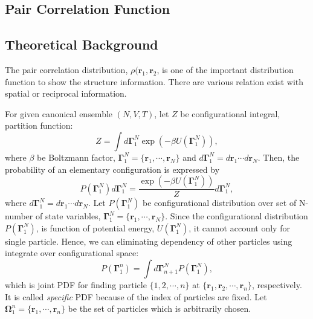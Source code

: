 \documentclass[10pt, a4paper]{report}
\begin{document}
\begin{appendices}
  \section{Pair Correlation Function}
  \label{appen_rdf}
  \subsection{Theoretical Background}
  The pair correlation distribution, $\rho(\mathbf{r}_1, \mathbf{r}_2$, is one of the important distribution function to show the structure information. There are various relation exist with spatial or reciprocal information.

  For given canonical ensemble $(N, V, T)$, let $Z$ be configurational integral, partition function:
  \begin{equation}
    Z = \int d\boldsymbol{\Gamma}_{1}^{N} \exp\left(-\beta U(\boldsymbol{\Gamma}_{1}^{N})\right),
  \end{equation}
  where $\beta$ be Boltzmann factor, $\boldsymbol{\Gamma}_{1}^{N} = \{\mathbf{r}_1,\cdots,\mathbf{r}_N\}$ and $d\boldsymbol{\Gamma}_{1}^{N} = d\mathbf{r}_1\cdots d\mathbf{r}_N$. Then, the probability of an elementary configuration is expressed by
  \begin{equation}
    P(\boldsymbol{\Gamma}_{1}^{N})d\boldsymbol{\Gamma}_{1}^{N} = \frac{\exp\left(-\beta U(\boldsymbol{\Gamma}_{1}^{N})\right)}{Z}d\boldsymbol{\Gamma}_{1}^{N},
  \end{equation}
  where $d\boldsymbol{\Gamma}_{1}^{N} = d\mathbf{r}_1\cdots d\mathbf{r}_N$.
  Let $P(\boldsymbol{\Gamma}_{1}^{N})$ be configurational distribution over set of N-number of state variables, $\boldsymbol{\Gamma}_{1}^{N} = \{\mathbf{r}_1, \cdots, \mathbf{r}_N\}$. Since the configurational distribution $P(\boldsymbol{\Gamma}_{1}^{N})$, is function of potential energy, $U(\boldsymbol{\Gamma}_{1}^{N})$, it cannot account only for single particle. Hence, we can eliminating dependency of other particles using integrate over configurational space:
  \begin{equation}
    P(\boldsymbol{\Gamma}_{1}^{n}) = \int d\boldsymbol{\Gamma}_{n+1}^{N} P(\boldsymbol{\Gamma}_{1}^{N}),
    \label{eq:reduced_configuration_distribution}
  \end{equation}
  which is joint PDF for finding particle $\{1, 2, \cdots, n\}$ at $\{\mathbf{r}_1, \mathbf{r}_2, \cdots, \mathbf{r}_n\}$, respectively. It is called \textit{specific} PDF because of the index of particles are fixed.
  Let $\boldsymbol{\Omega}_{1}^{n} = \{\mathbf{r}_1,\cdots,\mathbf{r}_n\}$ be the set of particles which is arbitrarily chosen.

\end{appendices}
\end{document}
